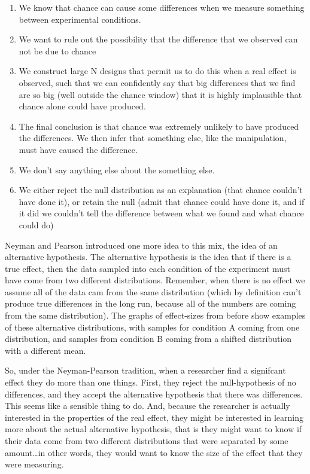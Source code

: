 \documentclass[]{book}
\providecommand{\tightlist}{%
  \setlength{\itemsep}{0pt}\setlength{\parskip}{0pt}}
\begin{document}
\begin{enumerate}
\def\labelenumi{\arabic{enumi}.}
\tightlist
\item
  We know that chance can cause some differences when we measure something between experimental conditions.
\item
  We want to rule out the possibility that the difference that we observed can not be due to chance
\item
  We construct large N designs that permit us to do this when a real effect is observed, such that we can confidently say that big differences that we find are so big (well outside the chance window) that it is highly implausible that chance alone could have produced.
\item
  The final conclusion is that chance was extremely unlikely to have produced the differences. We then infer that something else, like the manipulation, must have caused the difference.
\item
  We don't say anything else about the something else.
\item
  We either reject the null distribution as an explanation (that chance couldn't have done it), or retain the null (admit that chance could have done it, and if it did we couldn't tell the difference between what we found and what chance could do)
\end{enumerate}

Neyman and Pearson introduced one more idea to this mix, the idea of an alternative hypothesis. The alternative hypothesis is the idea that if there is a true effect, then the data sampled into each condition of the experiment must have come from two different distributions. Remember, when there is no effect we assume all of the data cam from the same distribution (which by definition can't produce true differences in the long run, because all of the numbers are coming from the same distribution). The graphs of effect-sizes from before show examples of these alternative distributions, with samples for condition A coming from one distribution, and samples from condition B coming from a shifted distribution with a different mean.

So, under the Neyman-Pearson tradition, when a researcher find a signifcant effect they do more than one things. First, they reject the null-hypothesis of no differences, and they accept the alternative hypothesis that there was differences. This seems like a sensible thing to do. And, because the researcher is actually interested in the properties of the real effect, they might be interested in learning more about the actual alternative hypothesis, that is they might want to know if their data come from two different distributions that were separated by some amount\ldots{}in other words, they would want to know the size of the effect that they were measuring.
\end{document}
